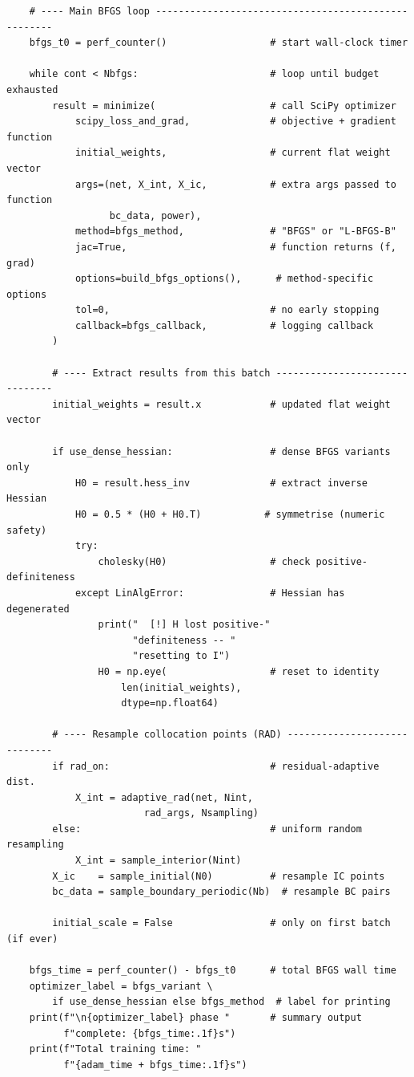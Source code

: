 \documentclass[11pt,a4paper]{article}
\begin{document}
\begin{lstlisting}
    # ---- Main BFGS loop ----------------------------------------------------
    bfgs_t0 = perf_counter()                  # start wall-clock timer

    while cont < Nbfgs:                       # loop until budget exhausted
        result = minimize(                    # call SciPy optimizer
            scipy_loss_and_grad,              # objective + gradient function
            initial_weights,                  # current flat weight vector
            args=(net, X_int, X_ic,           # extra args passed to function
                  bc_data, power),
            method=bfgs_method,               # "BFGS" or "L-BFGS-B"
            jac=True,                         # function returns (f, grad)
            options=build_bfgs_options(),      # method-specific options
            tol=0,                            # no early stopping
            callback=bfgs_callback,           # logging callback
        )

        # ---- Extract results from this batch -------------------------------
        initial_weights = result.x            # updated flat weight vector

        if use_dense_hessian:                 # dense BFGS variants only
            H0 = result.hess_inv              # extract inverse Hessian
            H0 = 0.5 * (H0 + H0.T)           # symmetrise (numeric safety)
            try:
                cholesky(H0)                  # check positive-definiteness
            except LinAlgError:               # Hessian has degenerated
                print("  [!] H lost positive-"
                      "definiteness -- "
                      "resetting to I")
                H0 = np.eye(                  # reset to identity
                    len(initial_weights),
                    dtype=np.float64)

        # ---- Resample collocation points (RAD) -----------------------------
        if rad_on:                            # residual-adaptive dist.
            X_int = adaptive_rad(net, Nint,
                        rad_args, Nsampling)
        else:                                 # uniform random resampling
            X_int = sample_interior(Nint)
        X_ic    = sample_initial(N0)          # resample IC points
        bc_data = sample_boundary_periodic(Nb)  # resample BC pairs

        initial_scale = False                 # only on first batch (if ever)

    bfgs_time = perf_counter() - bfgs_t0      # total BFGS wall time
    optimizer_label = bfgs_variant \
        if use_dense_hessian else bfgs_method  # label for printing
    print(f"\n{optimizer_label} phase "       # summary output
          f"complete: {bfgs_time:.1f}s")
    print(f"Total training time: "
          f"{adam_time + bfgs_time:.1f}s")


\end{lstlisting}
\end{document}
